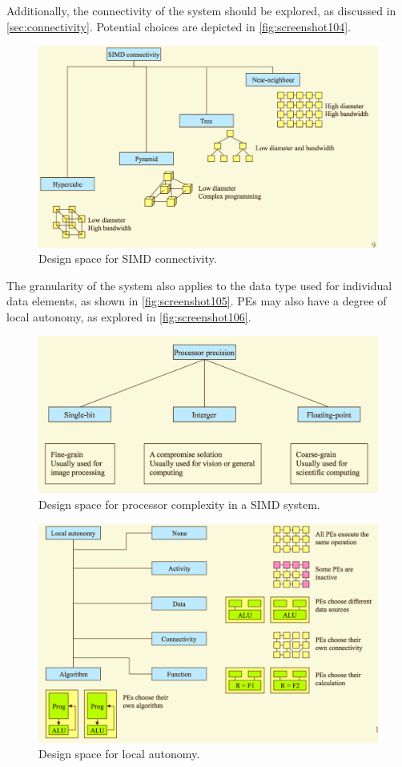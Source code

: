 Additionally, the connectivity of the system should be explored, as discussed in \autoref{sec:connectivity}. Potential choices are depicted in \autoref{fig:screenshot104}.

\begin{figure}
\centering
\includegraphics[width=0.7\linewidth]{figures/screenshot104}
\caption{Design space for SIMD connectivity.}
\label{fig:screenshot104}
\end{figure}

The granularity of the system also applies to the data type used for individual data elements, as shown in \autoref{fig:screenshot105}. PEs may also have a degree of local autonomy, as explored in \autoref{fig:screenshot106}.

\begin{figure}
\centering
\includegraphics[width=0.7\linewidth]{figures/screenshot105}
\caption{Design space for processor complexity in a SIMD system.}
\label{fig:screenshot105}
\end{figure}

\begin{figure}
\centering
\includegraphics[width=0.7\linewidth]{figures/screenshot106}
\caption{Design space for local autonomy.}
\label{fig:screenshot106}
\end{figure}

